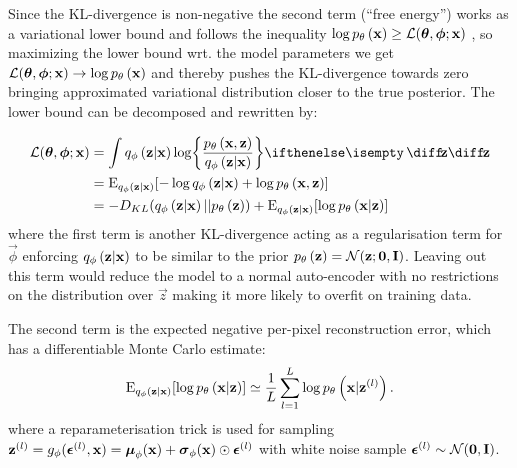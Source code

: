 Since the KL-divergence is non-negative the second term (``free energy'') works as a variational lower bound and follows the inequality $\log p_{\theta}\left(\bm{\mathrm{x}}\right) \ge \mathcal{L}(\bm{\mathrm{\theta}},\bm{\mathrm{\phi}};\bm{\mathrm{x}})$ , so maximizing the lower bound wrt. the model parameters we get $\mathcal{L}(\bm{\mathrm{\theta}},\bm{\mathrm{\phi}};\bm{\mathrm{x}})\rightarrow \log p_{\theta}\left(\bm{\mathrm{x}}\right)$ and thereby pushes the KL-divergence towards zero bringing approximated variational distribution closer to the true posterior.
The lower bound can be decomposed and rewritten by:

\begin{gather}
	\begin{split}
		\mathcal{L}\parens{\vec{\theta},\vec{\phi};\vec{x}} 
		& = \int \enc{\vec{z}|\vec{x}} \log \curlies*{ \frac{\dec{\vec{x},\vec{z}}}{\enc{\vec{z}|\vec{x}} } } \D{\vec{z}} \\ 
		& = \E_{\enc{\vec{z}|\vec{x}}} \brackets{- \log \enc{\vec{z}|\vec{x}} + \log \dec{\vec{x},\vec{z}} } 
		\\
		& = -D_{KL}\parens{ \enc{\vec{z}|\vec{x}}||\dec{\vec{z}} } + \E_{\enc{\vec{z}|\vec{x}}} \brackets{\log \dec{\vec{x}|\vec{z}} }    	
	\end{split} 
\end{gather}
where the first term is another KL-divergence acting as a regularisation term for $\vec{\phi}$ enforcing $q_{\phi}\left(\bm{\mathrm{z}}|\bm{\mathrm{x}}\right)$ to be similar to the prior $p_{\theta}\left(\bm{\mathrm{z}}\right)=\mathcal{N}(\bm{\mathrm{z}}; \bm{\mathrm{0}},\bm{\mathrm{I}})$. Leaving out this term would reduce the model to a normal auto-encoder with no restrictions on the distribution over $\vec{z}$ making it more likely to overfit on training data.

The second term is the expected negative per-pixel reconstruction error, which has a differentiable Monte Carlo estimate:
\begin{equation}
	\operatorname{E}_{q_{\phi}\left(\bm{\mathrm{z}}|\bm{\mathrm{x}}\right)} [\log p_{\theta}\left(\bm{\mathrm{x}}|\bm{\mathrm{z}}\right) ] \simeq \frac{1}{L}\sum^L_{l=1} \log p_{\theta}\left(\bm{\mathrm{x}}|\bm{\mathrm{z}}^{(l)}\right).
\end{equation}
where a reparameterisation trick is used for sampling $\bm{\mathrm{z}}^{(l)}= g_\phi (\bm{\mathrm{\epsilon}}^{(l)}, \bm{\mathrm{x}})= \bm{\mathrm{\mu}}_\phi(\bm{\mathrm{x}}) + \bm{\mathrm{\sigma}}_\phi(\bm{\mathrm{x}}) \odot \bm{\mathrm{\epsilon}}^{(l)}$ with white noise sample $\bm{\mathrm{\epsilon}}^{(l)} \sim \mathcal{N}(\bm{\mathrm{0}},\bm{\mathrm{I}})$.

